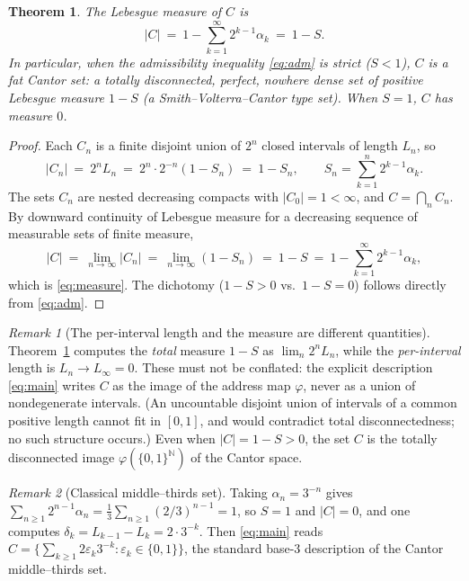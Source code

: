 \documentclass{amsart}
\newtheorem{theorem}{Theorem}
\theoremstyle{definition}
\theoremstyle{remark}
\newtheorem{remark}{Remark}
\begin{document}
\begin{theorem}\label{thm:meas}
The Lebesgue measure of $C$ is
\begin{equation}\label{eq:measure}
|C|\ =\ 1-\sum_{k=1}^{\infty}2^{k-1}\alpha_k\ =\ 1-S .
\end{equation}
In particular, when the admissibility inequality \eqref{eq:adm} is strict
($S<1$), $C$ is a \emph{fat} Cantor set: a totally disconnected, perfect, nowhere
dense set of \emph{positive} Lebesgue measure $1-S$ (a Smith--Volterra--Cantor type
set). When $S=1$, $C$ has measure $0$.
\end{theorem}

\begin{proof}
Each $C_n$ is a finite disjoint union of $2^n$ closed intervals of length $L_n$, so
\[
|C_n|\ =\ 2^{n}L_n\ =\ 2^{n}\cdot 2^{-n}(1-S_n)\ =\ 1-S_n,
\qquad S_n=\sum_{k=1}^{n}2^{k-1}\alpha_k .
\]
The sets $C_n$ are nested decreasing compacts with $|C_0|=1<\infty$, and
$C=\bigcap_n C_n$. By downward continuity of Lebesgue measure for a decreasing
sequence of measurable sets of finite measure,
\[
|C|\ =\ \lim_{n\to\infty}|C_n|\ =\ \lim_{n\to\infty}(1-S_n)\ =\ 1-S
\ =\ 1-\sum_{k=1}^{\infty}2^{k-1}\alpha_k,
\]
which is \eqref{eq:measure}. The dichotomy ($1-S>0$ vs.\ $1-S=0$) follows directly
from \eqref{eq:adm}.
\end{proof}

\begin{remark}[The per-interval length and the measure are different quantities]
Theorem~\ref{thm:meas} computes the \emph{total} measure $1-S$ as
$\lim_n 2^{n}L_n$, while the \emph{per-interval} length is $L_n\to L_\infty=0$.
These must not be conflated: the explicit description \eqref{eq:main} writes $C$ as
the image of the address map $\varphi$, never as a union of nondegenerate
intervals. (An uncountable disjoint union of intervals of a common positive length
cannot fit in $[0,1]$, and would contradict total disconnectedness; no such
structure occurs.) Even when $|C|=1-S>0$, the set $C$ is the totally disconnected
image $\varphi(\{0,1\}^{\mathbb N})$ of the Cantor space.
\end{remark}

\begin{remark}[Classical middle--thirds set]
Taking $\alpha_n=3^{-n}$ gives $\sum_{n\ge1}2^{n-1}\alpha_n=\tfrac13\sum_{n\ge1}(2/3)^{n-1}=1$,
so $S=1$ and $|C|=0$, and one computes $\delta_k=L_{k-1}-L_k=2\cdot3^{-k}$. Then
\eqref{eq:main} reads
$C=\bigl\{\sum_{k\ge1}2\varepsilon_k 3^{-k}:\varepsilon_k\in\{0,1\}\bigr\}$, the
standard base-$3$ description of the Cantor middle--thirds set.
\end{remark}
\end{document}
